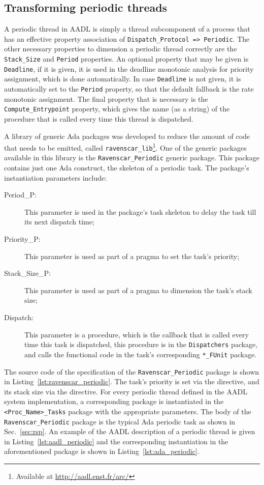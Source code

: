\subsection{Transforming periodic threads}
A periodic thread in AADL is simply a thread subcomponent of a process
that has an effective property association of
\texttt{Dispatch\_Protocol => Periodic}. The other necessary
properties to dimension a periodic thread correctly are the
\texttt{Stack\_Size} and \texttt{Period} properties. An optional
property that may be given is \texttt{Deadline}, if it is given, it is
used in the deadline monotonic analysis for priority assignment, which
is done automatically. In case \texttt{Deadline} is not given, it is
automatically set to the \texttt{Period} property, so that the default
fallback is the rate monotonic assignment. The final property that is
necessary is the \texttt{Compute\_Entrypoint} property, which gives
the name (as a string) of the procedure that is called every time this
thread is dispatched.

A library of generic Ada packages was developed to reduce the amount
of code that needs to be emitted, called
\texttt{ravenscar\_lib}\footnote{Available at
  \url{http://aadl.enst.fr/arc/}}. One of the generic packages
available in this library is the \texttt{Ravenscar\_Periodic} generic
package. This package contains just one Ada construct, the skeleton of
a periodic task. The package's instantiation parameters include:

\begin{description}
\item[Period\_P:]{This parameter is used in the package's task
  skeleton to delay the task till its next dispatch time;}
\item[Priority\_P:]{This parameter is used as part of a pragma to set
  the task's priority;}
\item[Stack\_Size\_P:]{This parameter is used as part of a pragma to
  dimension the task's stack size;}
\item[Dispatch:]{This parameter is a procedure, which is the callback
  that is called every time this task is dispatched, this procedure is
  in the \texttt{Dispatchers} package, and calls the functional code
  in the task's corresponding \texttt{*\_FUnit} package.}
\end{description}

The source code of the specification of the
\texttt{Ravenscar\_Periodic} package is shown in
Listing~\ref{lst:ravenscar_periodic}. The task's priority is set via
the  directive, and its stack size via the
 directive. For every periodic thread defined
in the AADL system implementation, a corresponding package is
instantiated in the \texttt{<Proc\_Name>\_Tasks} package with the
appropriate parameters. The body of the \texttt{Ravenscar\_Periodic}
package is the typical Ada periodic task as shown in
Sec.~\ref{sec:rsp}. An example of the AADL description of a periodic
thread is given in Listing~\ref{lst:aadl_periodic} and the
corresponding instantiation in the aforementioned package is shown in
Listing~\ref{lst:ada_periodic}.


